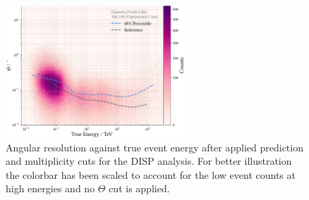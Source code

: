 \begin{figure}
    \centering
    \captionsetup{width=0.9\linewidth}
    \includegraphics[width=0.6\textwidth]{../analysis/plots/sensitivity/disp_resolution.pdf} 
    \caption{Angular resolution against true event energy after applied 
    prediction and multiplicity cuts for the DISP analysis.
    For better illustration the colorbar has been scaled to account for the
    low event counts at high energies and no $\Theta$ cut is applied.}
    \label{fig:disp_resol}
\end{figure}